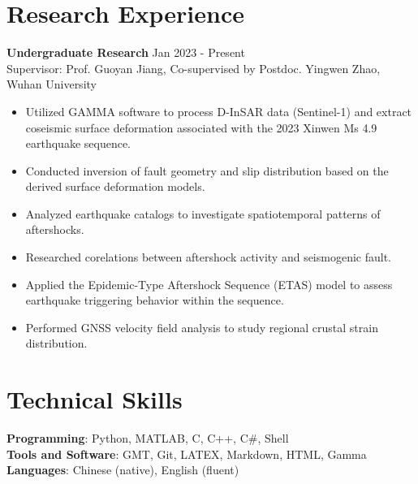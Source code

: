 \documentclass[a4paper, 10pt]{article}
\begin{document}
\section*{Research Experience}
\noindent \textbf{Undergraduate Research} \hfill Jan 2023 - Present \\
Supervisor: Prof. Guoyan Jiang, Co-supervised by Postdoc. Yingwen Zhao, Wuhan University
\begin{itemize}
    \item Utilized GAMMA software to process D-InSAR data (Sentinel-1) and extract coseismic surface deformation associated with the 2023 Xinwen Ms 4.9 earthquake sequence.  
    \item Conducted inversion of fault geometry and slip distribution based on the derived surface deformation models.  
    \item Analyzed earthquake catalogs to investigate spatiotemporal patterns of aftershocks.
    \item Researched corelations between aftershock activity and seismogenic fault.
    \item Applied the Epidemic-Type Aftershock Sequence (ETAS) model to assess earthquake triggering behavior within the sequence.  
    \item Performed GNSS velocity field analysis to study regional crustal strain distribution.
\end{itemize}

\section*{Technical Skills}
\noindent \textbf{Programming}: Python, MATLAB, C, C++, C\#, Shell \\
\textbf{Tools and Software}: GMT, Git, LATEX, Markdown, HTML, Gamma\\
\textbf{Languages}: Chinese (native), English (fluent)

\end{document}
